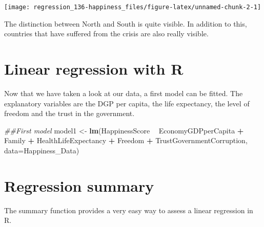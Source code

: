 \documentclass[]{book}
\newenvironment{Shaded}{\begin{snugshade}}{\end{snugshade}}
\newcommand{\CommentTok}[1]{\textcolor[rgb]{0.56,0.35,0.01}{\textit{#1}}}
\newcommand{\DataTypeTok}[1]{\textcolor[rgb]{0.13,0.29,0.53}{#1}}
\newcommand{\KeywordTok}[1]{\textcolor[rgb]{0.13,0.29,0.53}{\textbf{#1}}}
\newcommand{\NormalTok}[1]{#1}
\newcommand{\OperatorTok}[1]{\textcolor[rgb]{0.81,0.36,0.00}{\textbf{#1}}}
\newcommand{\StringTok}[1]{\textcolor[rgb]{0.31,0.60,0.02}{#1}}
\begin{document}
\begin{center}\texttt{[image: regression\_136-happiness\_files/figure-latex/unnamed-chunk-2-1]} \end{center}

The distinction between North and South is quite visible. In addition to this, countries that have suffered from the crisis are also really visible.

\hypertarget{linear-regression-with-r}{%
\section{Linear regression with R}\label{linear-regression-with-r}}

Now that we have taken a look at our data, a first model can be fitted. The explanatory variables are the DGP per capita, the life expectancy, the level of freedom and the trust in the government.

\begin{Shaded}
\begin{Highlighting}[]
\CommentTok{##First model}
\NormalTok{model1 <-}\StringTok{ }\KeywordTok{lm}\NormalTok{(HappinessScore }\OperatorTok{~}\StringTok{ }\NormalTok{EconomyGDPperCapita }\OperatorTok{+}\StringTok{ }\NormalTok{Family }\OperatorTok{+}\StringTok{ }
\StringTok{                 }\NormalTok{HealthLifeExpectancy }\OperatorTok{+}\StringTok{ }\NormalTok{Freedom }\OperatorTok{+}\StringTok{ }\NormalTok{TrustGovernmentCorruption, }
             \DataTypeTok{data=}\NormalTok{Happiness_Data)}
\end{Highlighting}
\end{Shaded}

\hypertarget{regression-summary}{%
\section{Regression summary}\label{regression-summary}}

The summary function provides a very easy way to assess a linear regression in R.
\end{document}
